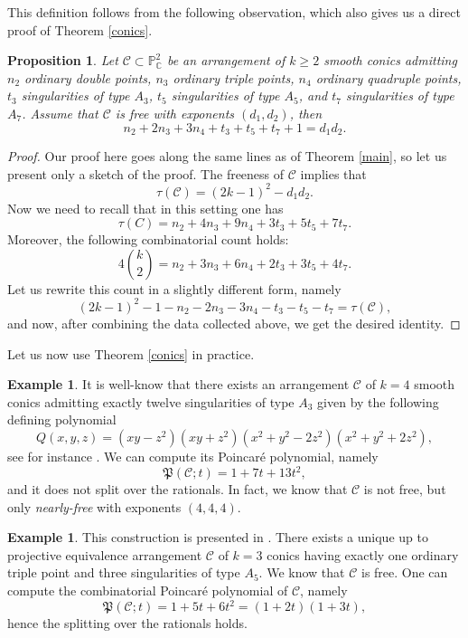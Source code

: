 \documentclass[12pt]{article}
\theoremstyle{plain}
\newtheorem{proposition}[thm]{Proposition}
\theoremstyle{definition}
\newtheorem{example}[thm]{Example}
\begin{document}
This definition follows from the following observation, which also gives us a direct proof of Theorem \ref{conics}.
\begin{proposition}
Let $\mathcal{C} \subset \mathbb{P}^{2}_{\mathbb{C}}$ be an arrangement of $k\geq 2$ smooth conics admitting $n_{2}$ ordinary double points, $n_{3}$ ordinary triple points, $n_{4}$ ordinary quadruple points, $t_{3}$ singularities of type $A_{3}$, $t_{5}$ singularities of type $A_{5}$, and $t_{7}$ singularities of type $A_{7}$. Assume that $\mathcal{C}$ is free with exponents $(d_{1},d_{2})$, then
\begin{equation}
\label{con}
n_{2}+2n_{3}+3n_{4} + t_{3}+t_{5}+t_{7} + 1 = d_{1}d_{2}.
\end{equation}
\end{proposition}
\begin{proof}
Our proof here goes along the same lines as of Theorem \ref{main}, so let us present only a sketch of the proof.
The freeness of $\mathcal{C}$ implies that
$$\tau(\mathcal{C}) = (2k-1)^{2} - d_{1}d_{2}.$$
Now we need to recall that in this setting one has
$$\tau(C) = n_{2} + 4n_{3} + 9n_{4} + 3t_{3} + 5t_{5} + 7t_{7}.$$
Moreover, the following combinatorial count holds:
$$4 \binom{k}{2} = n_{2} +3n_{3} + 6n_{4} + 2t_{3} + 3t_{5} + 4t_{7}.$$
Let us rewrite this count in a slightly different form, namely
$$(2k-1)^2 - 1 - n_{2} - 2n_{3} - 3n_{4} -t_{3} - t_{5} - t_{7} = \tau(\mathcal{C}),$$
and now, after combining the data collected above, we get the desired identity.
\end{proof}
Let us now use Theorem \ref{conics} in practice.
\begin{example}
It is well-know that there exists an arrangement $\mathcal{C}$ of $k=4$ smooth conics admitting exactly twelve singularities of type $A_{3}$ given by the following defining polynomial
$$Q(x,y,z) = (xy-z^{2})(xy+z^{2})(x^{2}+y^{2}-2z^{2})(x^{2}+y^{2}+2z^{2}),$$
see for instance \cite[Example 4.4]{Malara}. We can compute its Poincar\'e polynomial, namely
$$\mathfrak{P}(\mathcal{C};t) = 1+7t + 13t^2,$$
and it does not split over the rationals. In fact, we know that $\mathcal{C}$ is not free, but only \textit{nearly-free} with exponents $(4,4,4)$.
\end{example}
\begin{example}
This construction is presented in \cite[Remark 2.5]{PP2023}. There exists a unique up to projective equivalence arrangement $\mathcal{C}$ of $k=3$ conics having exactly one ordinary triple point and three singularities of type $A_{5}$. We know that $\mathcal{C}$ is free. One can compute the combinatorial Poincar\'e polynomial of $\mathcal{C}$, namely
$$\mathfrak{P}(\mathcal{C};t) = 1 + 5t + 6t^2 = (1+2t)(1+3t),$$
hence the splitting over the rationals holds.
\end{example}
\end{document}
